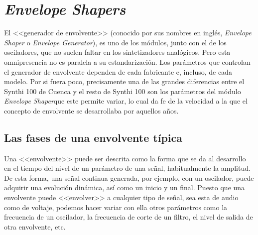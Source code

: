 \section{\textit{Envelope Shapers}}

El <<generador de envolvente>> (conocido por sus nombres en inglés, \textit{Envelope Shaper} o \textit{Envelope Generator}), es uno de los módulos, junto con el de los osciladores, que no suelen faltar en los sintetizadores analógicos. Pero esta omnipresencia no es paralela a su estandarización. Los parámetros que controlan el generador de envolvente dependen de cada fabricante e, incluso, de cada modelo. Por si fuera poco, precisamente una de las grandes diferencias entre el Synthi 100 de Cuenca y el resto de Synthi 100 son los parámetros del módulo \textit{Envelope Shaper}que este permite variar, lo cual da fe de la velocidad a la que el concepto de envolvente se desarrollaba por aquellos años.

\subsection{Las fases de una envolvente típica}

Una <<envolvente>> puede ser descrita como la forma que se da al desarrollo en el tiempo del nivel de un parámetro de una señal, habitualmente la amplitud. De esta forma, una señal continua generada, por ejemplo, con un oscilador, puede adquirir una evolución dinámica, así como un inicio y un final. Puesto que una envolvente puede <<envolver>> a cualquier tipo de señal, sea esta de audio como de voltaje, podemos hacer variar con ella otros parámetros como la frecuencia de un oscilador, la frecuencia de corte de un filtro, el nivel de salida de otra envolvente, etc.

